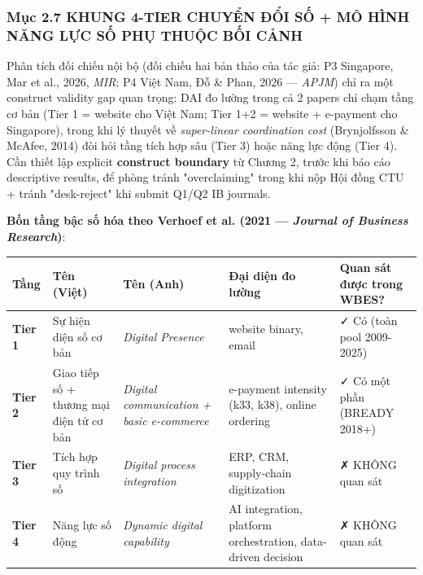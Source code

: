 \documentclass[12pt,a4paper]{article}
\begin{document}
\hypertarget{mux1ee5c-27-khung-4-tier-chuyux1ec3n-ux111ux1ed5i-sux1ed1--muxf4-huxecnh-nux103ng-lux1ef1c-sux1ed1-phux1ee5-thuux1ed9c-bux1ed1i-cux1ea3nh}{%
\subsubsection{Mục 2.7 KHUNG 4-TIER CHUYỂN ĐỔI SỐ + MÔ HÌNH NĂNG LỰC SỐ
PHỤ THUỘC BỐI
CẢNH}\label{mux1ee5c-27-khung-4-tier-chuyux1ec3n-ux111ux1ed5i-sux1ed1--muxf4-huxecnh-nux103ng-lux1ef1c-sux1ed1-phux1ee5-thuux1ed9c-bux1ed1i-cux1ea3nh}}

Phân tích đối chiếu nội bộ (đối chiếu hai bản thảo của tác giả: P3
Singapore, Mar et al., 2026, \emph{MIR}; P4 Việt Nam, Đỗ \& Phan, 2026
--- \emph{APJM}) chỉ ra một construct validity gap quan trọng: DAI đo
lường trong cả 2 papers chỉ chạm tầng cơ bản (Tier 1 = website cho Việt
Nam; Tier 1+2 = website + e-payment cho Singapore), trong khi lý thuyết
về \emph{super-linear coordination cost} (Brynjolfsson \& McAfee, 2014)
đòi hỏi tầng tích hợp sâu (Tier 3) hoặc năng lực động (Tier 4). Cần
thiết lập explicit \textbf{construct boundary} từ Chương 2, trước khi
báo cáo descriptive results, để phòng tránh "overclaiming" trong khi nộp
Hội đồng CTU + tránh "desk-reject" khi submit Q1/Q2 IB journals.

\textbf{Bốn tầng bậc số hóa theo Verhoef et al. (2021 --- \emph{Journal
of Business Research})}:

\begin{longtable}[]{@{}lllll@{}}
\toprule\noalign{}
Tầng & Tên (Việt) & Tên (Anh) & Đại diện đo lường & Quan sát được trong
WBES? \\
\midrule\noalign{}
\endhead
\bottomrule\noalign{}
\endlastfoot
\textbf{Tier 1} & Sự hiện diện số cơ bản & \emph{Digital Presence} &
website binary, email & ✓ Có (toàn pool 2009-2025) \\
\textbf{Tier 2} & Giao tiếp số + thương mại điện tử cơ bản &
\emph{Digital communication + basic e-commerce} & e-payment intensity
(k33, k38), online ordering & ✓ Có một phần (BREADY 2018+) \\
\textbf{Tier 3} & Tích hợp quy trình số & \emph{Digital process
integration} & ERP, CRM, supply-chain digitization & ✗ KHÔNG quan sát \\
\textbf{Tier 4} & Năng lực số động & \emph{Dynamic digital capability} &
AI integration, platform orchestration, data-driven decision & ✗ KHÔNG
quan sát \\
\end{longtable}
\end{document}
